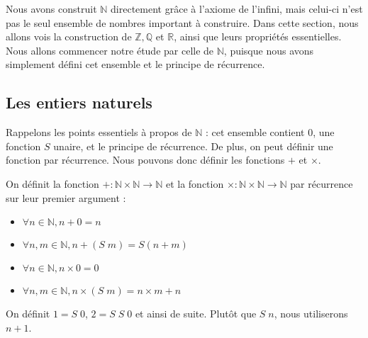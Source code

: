 Nous avons construit $\mathbb N$ directement grâce à l'axiome de l'infini, mais
celui-ci n'est pas le seul ensemble de nombres important à construire. Dans
cette section, nous allons vois la construction de $\mathbb Z, \mathbb Q$ et
$\mathbb R$, ainsi que leurs propriétés essentielles. Nous allons commencer
notre étude par celle de $\mathbb N$, puisque nous avons simplement défini cet
ensemble et le principe de récurrence.

\subsection{Les entiers naturels}

Rappelons les points essentiels à propos de $\mathbb N$ : cet ensemble contient
$0$, une fonction $S$ unaire, et le principe de récurrence. De plus, on peut
définir une fonction par récurrence. Nous pouvons donc définir les fonctions
$+$ et $\times$.

\begin{definition}
  On définit la fonction $+ : \mathbb N \times \mathbb N \to \mathbb N$ et la
  fonction $\times : \mathbb N \times \mathbb N \to \mathbb N$ par récurrence
  sur leur premier argument :
  \begin{itemize}
  \item $\forall n \in \mathbb N, n + 0 = n$
  \item $\forall n,m\in \mathbb N, n + (S\;m) = S(n + m)$
  \item $\forall n \in \mathbb N, n \times 0 = 0$
  \item $\forall n,m\in\mathbb N, n \times (S\;m) = n\times m + n$
  \end{itemize}
\end{definition}

\begin{notation}
  On définit $1 = S\;0$, $2 = S\;S\;0$ et ainsi de suite. Plutôt que $S\;n$,
  nous utiliserons $n + 1$.
\end{notation}

